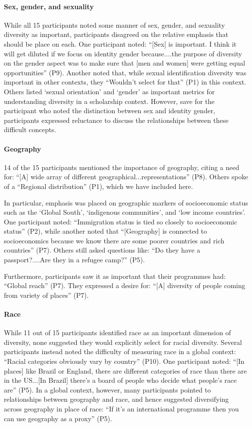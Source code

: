 \paragraph{Sex, gender, and sexuality}
While all 15 participants noted some manner of sex, gender, and sexuality diversity as important, participants disagreed on the relative emphasis that should be place on each. One participant noted: ``[Sex] is important. I think it will get diluted if we focus on identity gender because....the purpose of diversity on the gender aspect was to make sure that [men and women] were getting equal opportunities'' (P9). Another noted that, while sexual identification diversity was important in other contexts, they ``Wouldn't select for that'' (P1) in this context. Others listed `sexual orientation' and `gender' as important metrics for understanding diversity in a scholarship context. However, save for the participant who noted the distinction between sex and identity gender, participants expressed reluctance to discuss the relationships between these difficult concepts.

\paragraph{Geography}
14 of the 15 participants mentioned the importance of geography, citing a need for: ``[A] wide array of different geographical...representations'' (P8). Others spoke of a ``Regional distribution'' (P1), which we have included here.

In particular, emphasis was placed on geographic markers of socioeconomic status such as  the `Global South', `indigenous communities', and `low income countries'. One participant noted: ``Immigration status is tied so closely to socioeconomic status'' (P2), while another noted that ``[Geography] is connected to socioeconomics because we know there are some poorer countries and rich countries'' (P7). Others still asked questions like: ``Do they have a passport?....Are they in a refugee camp?'' (P5).

Furthermore, participants saw it as important that their programmes had: ``Global reach'' (P7). They expressed a desire for: ``[A] diversity of people coming from variety of places'' (P7).

\paragraph{Race}
While 11 out of 15 participants identified race as an important dimension of diversity, none suggested they would explicitly select for racial diversity. Several participants instead noted the difficulty of measuring race in a global context: ``Racial categories obviously vary by country'' (P10). One participant noted: ``[In places] like Brazil or England, there are different categories of race than there are in the US...[In Brazil] there's a board of people who decide what people's race are'' (P5). In a global context, however, many participants pointed to relationships between geography and race, and hence suggested diversifying across geography in place of race: ``If it's an international programme then you can use geography as a proxy'' (P5).


